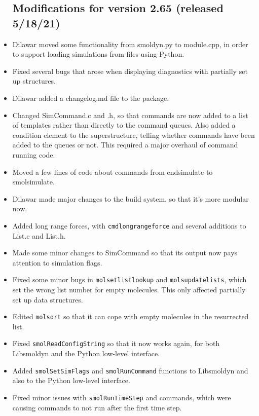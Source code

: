 \documentclass {scrbook}
\newcommand {\ttt} {\texttt}
\begin{document}
\begin{itemize}
\subsection{Modifications for version 2.65 (released 5/18/21)}
\item Dilawar moved some functionality from smoldyn.py to module.cpp, in order to support loading simulations from files using Python.
\item Fixed several bugs that arose when displaying diagnostics with partially set up structures.
\item Dilawar added a changelog.md file to the package.
\item Changed SimCommand.c and .h, so that commands are now added to a list of templates rather than directly to the command queues. Also added a condition element to the superstructure, telling whether commands have been added to the queues or not. This required a major overhaul of command running code.
\item Moved a few lines of code about commands from endsimulate to smolsimulate.
\item Dilawar made major changes to the build system, so that it's more modular now.
\item Added long range forces, with \ttt{cmdlongrangeforce} and several additions to List.c and List.h.
\item Made some minor changes to SimCommand so that its output now pays attention to simulation flags.
\item Fixed some minor bugs in \ttt{molsetlistlookup} and \ttt{molsupdatelists}, which set the wrong list number for empty molecules. This only affected partially set up data structures.
\item Edited \ttt{molsort} so that it can cope with empty molecules in the resurrected list.
\item Fixed \ttt{smolReadConfigString} so that it now works again, for both Libsmoldyn and the Python low-level interface.
\item Added \ttt{smolSetSimFlags} and \ttt{smolRunCommand} functions to Libsmoldyn and also to the Python low-level interface.
\item Fixed minor issues with \ttt{smolRunTimeStep} and commands, which were causing commands to not run after the first time step.


\end{itemize}
\end{document}
